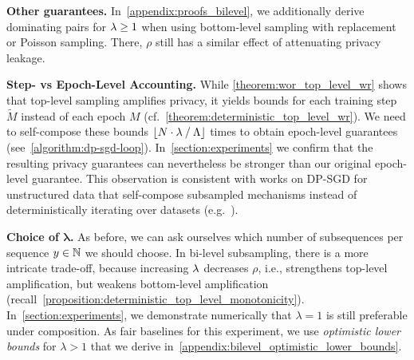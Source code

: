 \textbf{Other guarantees.}
In~\cref{appendix:proofs_bilevel}, we additionally derive dominating pairs for $\lambda \geq 1$
when using bottom-level sampling with replacement or Poisson sampling.
There, $\rho$ still has a similar effect of attenuating privacy leakage.

\textbf{Step- vs Epoch-Level Accounting.}
While \cref{theorem:wor_top_level_wr} shows that top-level sampling amplifies privacy, 
it yields bounds 
for each training step $\tilde{M}$ instead of each epoch $M$  (cf.~\cref{theorem:deterministic_top_level_wr}). We need to self-compose these bounds  
$\lfloor N \cdot \lambda \mathbin{/} \Lambda \rfloor$ times to obtain epoch-level guarantees (see~\cref{algorithm:dp-sgd-loop}). 
In~\cref{section:experiments} we confirm that the resulting privacy guarantees can nevertheless be stronger than our original epoch-level guarantee.
This observation is consistent with works on DP-SGD for unstructured data that self-compose subsampled mechanisms instead of deterministically iterating over datasets (e.g.~\cite{abadi2016deep}).


\textbf{Choice of $\bm{\lambda}$.}
As before, we can ask ourselves which number of subsequences per sequence $y \in {\mathbb{N}}$ we should choose. 
In bi-level subsampling, there is a more intricate trade-off,
because increasing $\lambda$ decreases $\rho$, i.e., strengthens top-level amplification, but weakens bottom-level amplification (recall~\cref{proposition:deterministic_top_level_monotonicity}).
In~\cref{section:experiments}, we demonstrate numerically that $\lambda = 1$ is still  preferable under composition.
As fair baselines for this experiment, 
we use \emph{optimistic lower bounds} for $\lambda > 1$ that we derive in~\cref{appendix:bilevel_optimistic_lower_bounds}.
 

